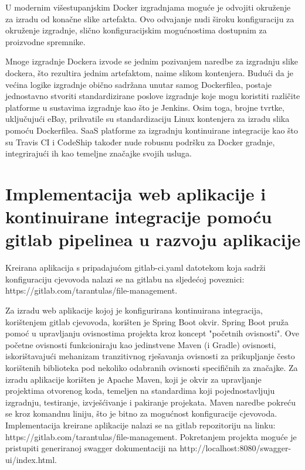 \documentclass[a4paper,12pt,oneside]{article}
\begin{document}
U modernim višestupanjskim Docker izgradnjama moguće je odvojiti okruženje za izradu od konačne slike artefakta. Ovo odvajanje nudi široku konfiguraciju za okruženje izgradnje, slično konfiguracijskim mogućnostima dostupnim za proizvodne spremnike.

Mnoge izgradnje Dockera izvode se jednim pozivanjem naredbe za izgradnju slike dockera, što rezultira jednim artefaktom, naime slikom kontenjera. Budući da je većina logike izgradnje obično sadržana unutar samog Dockerfilea, postaje jednostavno stvoriti standardizirane poslove izgradnje koje mogu koristiti različite platforme u sustavima izgradnje kao što je Jenkins. Osim toga, brojne tvrtke, uključujući eBay, prihvatile su standardizaciju Linux kontenjera za izradu slika pomoću Dockerfilea. SaaS platforme za izgradnju kontinuirane integracije kao što su Travis CI i CodeShip također nude robusnu podršku za Docker gradnje, integrirajući ih kao temeljne značajke svojih usluga.

\newpage

\section{Implementacija web aplikacije i kontinuirane integracije pomoću gitlab pipelinea u razvoju aplikacije}

Kreirana aplikacija s pripadajućom gitlab-ci.yaml datotekom koja sadrži konfiguraciju cjevovoda nalazi se na gitlabu na sljedećoj poveznici: https://gitlab.com/tarantulas/file-management. 

 Za izradu web aplikacije kojoj je konfigurirana kontinuirana integracija, korištenjem gitlab cjevovoda, korišten je Spring Boot okvir. Spring Boot pruža pomoć u upravljanju ovisnostima projekta kroz koncept "početnih ovisnosti". Ove početne ovisnosti funkcioniraju kao jedinstvene Maven (i Gradle) ovisnosti, iskorištavajući mehanizam tranzitivnog rješavanja ovisnosti za prikupljanje često korištenih biblioteka pod nekoliko odabranih ovisnosti specifičnih za značajke.\cite{springBootInAction} Za izradu aplikacije korišten je Apache Maven, koji je okvir za upravljanje projektima otvorenog koda, temeljen na standardima koji pojednostavljuju izgradnju, testiranje, izvješćivanje i pakiranje projekata. Maven naredbe pokreću se kroz komandnu liniju, što je bitno za mogućnost konfiguracije cjevovoda. Implementacija kreirane aplikacije nalazi se na gitlab repozitoriju na linku: https://gitlab.com/tarantulas/file-management. Pokretanjem projekta moguće je pristupiti generiranoj swagger dokumentaciji na http://localhost:8080/swagger-ui/index.html.
\end{document}
